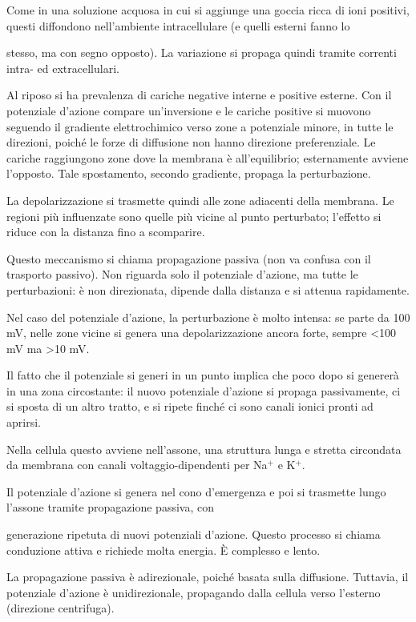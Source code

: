 \documentclass[12pt,a4paper]{book}
\begin{document}
Come in una soluzione acquosa in cui si aggiunge una goccia ricca di ioni positivi, questi diffondono nell'ambiente intracellulare (e quelli esterni fanno lo

stesso, ma con segno opposto). La variazione si propaga quindi tramite correnti intra- ed extracellulari.

Al riposo si ha prevalenza di cariche negative interne e positive esterne. Con il potenziale d'azione compare un'inversione e le cariche positive si muovono seguendo il gradiente elettrochimico verso zone a potenziale minore, in tutte le direzioni, poiché le forze di diffusione non hanno direzione preferenziale. Le cariche raggiungono zone dove la membrana è all'equilibrio; esternamente avviene l'opposto. Tale spostamento, secondo gradiente, propaga la perturbazione.

La depolarizzazione si trasmette quindi alle zone adiacenti della membrana. Le regioni più influenzate sono quelle più vicine al punto perturbato; l'effetto si riduce con la distanza fino a scomparire.

Questo meccanismo si chiama propagazione passiva (non va confusa con il trasporto passivo). Non riguarda solo il potenziale d'azione, ma tutte le perturbazioni: è non direzionata, dipende dalla distanza e si attenua rapidamente.

Nel caso del potenziale d'azione, la perturbazione è molto intensa: se parte da 100 mV, nelle zone vicine si genera una depolarizzazione ancora forte, sempre <100 mV ma >10 mV.

Il fatto che il potenziale si generi in un punto implica che poco dopo si genererà in una zona circostante: il nuovo potenziale d'azione si propaga passivamente, ci si sposta di un altro tratto, e si ripete finché ci sono canali ionici pronti ad aprirsi.

Nella cellula questo avviene nell'assone, una struttura lunga e stretta circondata da membrana con canali voltaggio-dipendenti per Na$^{+}$ e K$^{+}$.

Il potenziale d'azione si genera nel cono d'emergenza e poi si trasmette lungo l'assone tramite propagazione passiva, con

generazione ripetuta di nuovi potenziali d'azione. Questo processo si chiama conduzione attiva e richiede molta energia. È complesso e lento.

La propagazione passiva è adirezionale, poiché basata sulla diffusione. Tuttavia, il potenziale d'azione è unidirezionale, propagando dalla cellula verso l'esterno (direzione centrifuga).
\end{document}
